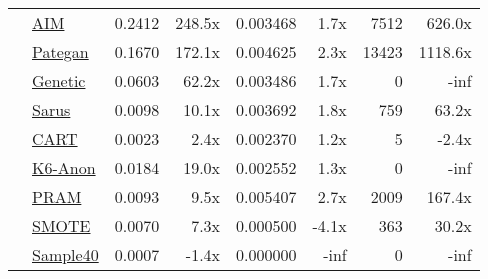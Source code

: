 \begin{table}
\begin{tabular}{llr@{\hskip 6pt}r@{\hskip 14pt}r@{\hskip 6pt}r@{\hskip 14pt}rr}
        \cellcolor{ForestGreen} & \href{https://htmlpreview.github.io/?https://github.com/yoid2000/sdnist-summary/blob/main/results/aim_e_10_all/report.html}{AIM} & 0.2412 & 248.5x & 0.003468 & 1.7x & 7512 & 626.0x \\
        \cellcolor{ForestGreen} & \href{https://htmlpreview.github.io/?https://github.com/yoid2000/sdnist-summary/blob/main/results/pategan_n_iter_50_e_10_all/report.html}{Pategan} & 0.1670 & 172.1x & 0.004625 & 2.3x & 13423 & 1118.6x \\
        \cellcolor{YellowGreen} & \href{https://htmlpreview.github.io/?https://github.com/yoid2000/sdnist-summary/blob/main/results/genetic_sd_e_10_simple/report.html}{Genetic} & 0.0603 & 62.2x & 0.003486 & 1.7x & 0 & -inf \\
        \cellcolor{YellowGreen} & \href{https://htmlpreview.github.io/?https://github.com/yoid2000/sdnist-summary/blob/main/results/sarus_sdg_demographic/report.html}{Sarus} & 0.0098 & 10.1x & 0.003692 & 1.8x & 759 & 63.2x \\
        \cellcolor{SkyBlue} & \href{https://htmlpreview.github.io/?https://github.com/yoid2000/sdnist-summary/blob/main/results/cart_cf21/report.html}{CART} & 0.0023 & 2.4x & 0.002370 & 1.2x & 5 & -2.4x \\
        \cellcolor{Salmon} & \href{https://htmlpreview.github.io/?https://github.com/yoid2000/sdnist-summary/blob/main/results/k_anonymity_k_6/report.html}{K6-Anon} & 0.0184 & 19.0x & 0.002552 & 1.3x & 0 & -inf \\
        \cellcolor{Goldenrod} & \href{https://htmlpreview.github.io/?https://github.com/yoid2000/sdnist-summary/blob/main/results/pram_default/report.html}{PRAM} & 0.0093 & 9.5x & 0.005407 & 2.7x & 2009 & 167.4x \\
        \cellcolor{Tan} & \href{https://htmlpreview.github.io/?https://github.com/yoid2000/sdnist-summary/blob/main/results/smote_target_marital/report.html}{SMOTE} & 0.0070 & 7.3x & 0.000500 & -4.1x & 363 & 30.2x \\
        \cellcolor{Sepia} & \href{https://htmlpreview.github.io/?https://github.com/yoid2000/sdnist-summary/blob/main/results/subsample_40pcnt_all/report.html}{Sample40} & 0.0007 & -1.4x & 0.000000 & -inf & 0 & -inf \\
        \bottomrule
    \end{tabular}
\end{table}
